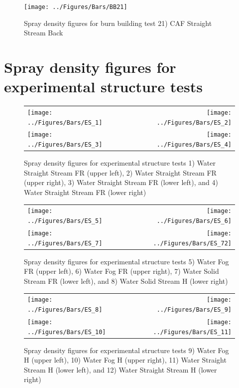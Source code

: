 \documentclass[12pt,oneside]{book}
\begin{document}
\clearpage

\begin{figure}[ht]
\centering
\texttt{[image: ../Figures/Bars/BB21]}
\caption{Spray density figures for burn building test 21) CAF Straight Stream Back}
\label{fig:bb_21}
\end{figure}

\clearpage

\section{Spray density figures for experimental structure tests}
\label{app:spray_es}

\begin{figure}[ht]
\begin{tabular*}{\textwidth}{lr}
\texttt{[image: ../Figures/Bars/ES\_1]} &
\texttt{[image: ../Figures/Bars/ES\_2]} \\
\texttt{[image: ../Figures/Bars/ES\_3]} &
\texttt{[image: ../Figures/Bars/ES\_4]}
\end{tabular*}
\caption{Spray density figures for experimental structure tests 1) Water Straight Stream FR (upper left), 2) Water Straight Stream FR (upper right), 3) Water Straight Stream FR (lower left), and 4) Water Straight Stream FR (lower right)}
\label{fig:es_1_4}
\end{figure}

\clearpage

\begin{figure}[ht]
\begin{tabular*}{\textwidth}{lr}
\texttt{[image: ../Figures/Bars/ES\_5]} &
\texttt{[image: ../Figures/Bars/ES\_6]} \\
\texttt{[image: ../Figures/Bars/ES\_7]} &
\texttt{[image: ../Figures/Bars/ES\_72]}
\end{tabular*}
\caption{Spray density figures for experimental structure tests 5) Water Fog FR (upper left), 6) Water Fog FR (upper right), 7) Water Solid Stream FR (lower left), and 8) Water Solid Stream H (lower right)}
\label{fig:es_5_72}
\end{figure}

\clearpage

\begin{figure}[ht]
\begin{tabular*}{\textwidth}{lr}
\texttt{[image: ../Figures/Bars/ES\_8]} &
\texttt{[image: ../Figures/Bars/ES\_9]} \\
\texttt{[image: ../Figures/Bars/ES\_10]} &
\texttt{[image: ../Figures/Bars/ES\_11]}
\end{tabular*}
\caption{Spray density figures for experimental structure tests 9) Water Fog H (upper left), 10) Water Fog H (upper right), 11) Water Straight Stream H (lower left), and 12) Water Straight Stream H (lower right)}
\label{fig:es_8_11}
\end{figure}
\end{document}
